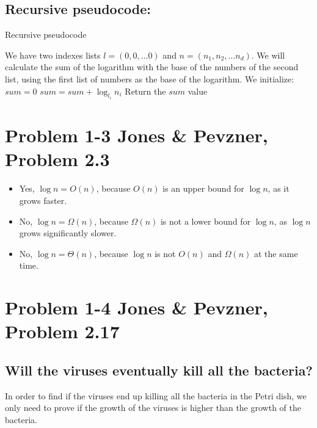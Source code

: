 \documentclass{article}
\begin{document}
\subsection*{Recursive pseudocode:}
\begin{algorithm}[H]
\caption{Recursive pseudocode}
\begin{algorithmic}[1]
\State We have two indexes lists $l = (0,0,...0)$ and $n = (n_1,n_2,...n_d)$.
\State We will calculate the sum of the logarithm with the base of the numbers of the second list, using the first list of numbers as the base of the logarithm.
\State We initialize: $sum = 0$
 \State $sum = sum + \log_{l_i} n_i$
\EndFor
\State Return the $sum$ value
\end{algorithmic}
\end{algorithm}

\section*{Problem 1-3 Jones \& Pevzner, Problem 2.3}

\begin{itemize}

\item Yes, $\log n = O(n)$, because $O(n)$ is an upper bound for $\log n$, as it grows faster.

\item No, $\log n = \Omega(n)$, because $\Omega(n)$ is not a lower bound for $\log n$, as $\log n$ grows significantly slower.

\item No, $\log n = \Theta(n)$, because $\log n$ is not $O(n)$ and $\Omega(n)$ at the same time.

\end{itemize}

\section*{Problem 1-4 Jones \& Pevzner, Problem 2.17}

\subsection*{Will the viruses eventually kill all the bacteria?}
In order to find if the viruses end up killing all the bacteria in the Petri dish, we only need to prove if the growth of the viruses is higher than the growth of the bacteria.
\end{document}

